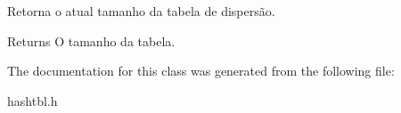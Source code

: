 Retorna o atual tamanho da tabela de dispersão. 

\begin{DoxyReturn}{Returns}
O tamanho da tabela. 
\end{DoxyReturn}


The documentation for this class was generated from the following file\+:\begin{DoxyCompactItemize}
\item 
hashtbl.\+h\end{DoxyCompactItemize}
